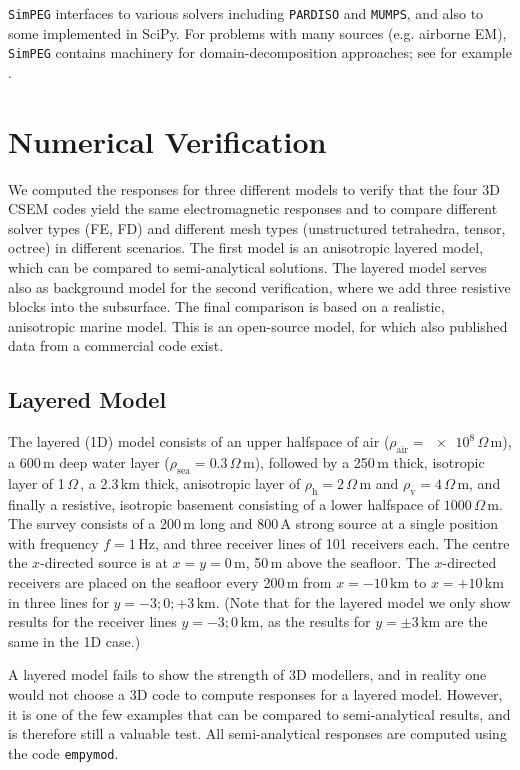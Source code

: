 \documentclass[
    paper,
  ]{geophysics}
\newcommand{\empymod}{\texttt{empymod}\xspace}
\newcommand{\simpeg}{\texttt{SimPEG}\xspace}
\newcommand{\ohmm}{\ensuremath{\Omega\,}\text{m}\xspace}
\begin{document}
\simpeg interfaces to various solvers including \texttt{PARDISO} and \texttt{MUMPS}, and also to some implemented in SciPy. For problems with many sources (e.g. airborne EM), \simpeg contains machinery for domain-decomposition approaches; see for example \cite{GEO.20.Fournier}.

\section{Numerical Verification}

We computed the responses for three different models to verify that the four 3D CSEM codes yield the same electromagnetic responses and to compare different solver types (FE, FD) and different mesh types (unstructured tetrahedra, tensor, octree) in different scenarios. The first model is an anisotropic layered model, which can be compared to semi-analytical solutions. The layered model serves also as background model for the second verification, where we add three resistive blocks into the subsurface. The final comparison is based on a realistic, anisotropic marine model. This is an open-source model, for which also published data from a commercial code exist.

\subsection{Layered Model}

The layered (1D) model consists of an upper halfspace of air ($\rho_\text{air}=\num{e8}\,\ohmm$), a 600\,m deep water layer ($\rho_\text{sea}=\num{0.3}\,\ohmm$), followed by a 250\,m thick, isotropic layer of 1\,\ohmm, a 2.3\,km thick, anisotropic layer of $\rho_\text{h}=2\,\ohmm$ and $\rho_\text{v}=4\,\ohmm$, and finally a resistive, isotropic basement consisting of a lower halfspace of $1000\,\ohmm$. The survey consists of a 200\,m long and 800\,A strong source at a single position with frequency $f=1\,$Hz, and three receiver lines of 101 receivers each. The centre the $x$-directed source is at $x=y=0\,$m, 50\,m above the seafloor. The $x$-directed receivers are placed on the seafloor every 200\,m from $x=-10\,$km to $x=+10\,$km in three lines for $y=-3; 0; +3\,$km. (Note that for the layered model we only show results for the receiver lines $y=-3; 0\,$km, as the results for $y=\pm3\,$km are the same in the 1D case.)


A layered model fails to show the strength of 3D modellers, and in reality one would not choose a 3D code to compute responses for a layered model. However, it is one of the few examples that can be compared to semi-analytical results, and is therefore still a valuable test. All semi-analytical responses are computed using the code \empymod\citep{GEO.17.Werthmuller}.
\end{document}
